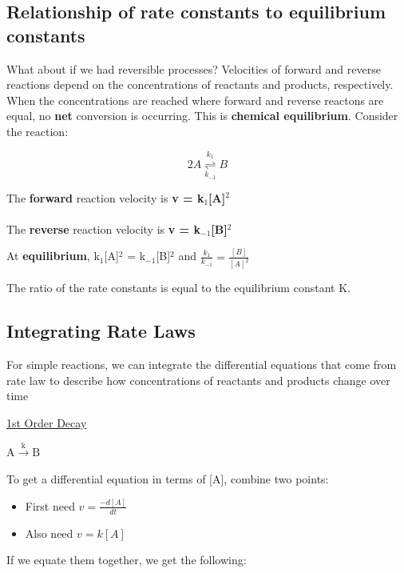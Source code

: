 \documentclass[12pt, letterpaper]{article}
\begin{document}
    \subsection*{Relationship of rate constants to equilibrium constants}

    What about if we had reversible processes? Velocities of forward and reverse reactions depend on the concentrations of 
    reactants and products, respectively. When the concentrations are reached where forward and reverse reactons are equal, 
    no \textbf{net} conversion is occurring. This is \textbf{chemical equilibrium}. Consider the reaction:

    \begin{equation}
        2 A \stackrel{k_1}{\underset{k_{-1}}{\rightleftharpoons}} B
    \end{equation}

    The \textbf{forward} reaction velocity is \textbf{v = k$_1$[A]$^2$} \\ \\
    The \textbf{reverse} reaction velocity is \textbf{v = k$_{-1}$[B]$^2$}


    At \textbf{equilibrium}, k$_1$[A]$^2$ = k$_{-1}$[B]$^2$ and \( \frac{k_1}{k_{-1}} = \frac{[B]}{[A]^2} \)

    The ratio of the rate constants is equal to the equilibrium constant K. 

    \subsection*{Integrating Rate Laws}

    For simple reactions, we can integrate the differential equations that come from rate law to describe how concentrations of reactants and products change over time

    \underline{1st Order Decay}
    
    \(\mathrm{A} \stackrel{\mathrm{k}}{\longrightarrow} \mathrm{B} \)

    To get a differential equation in terms of [A], combine two points: 
    \begin{itemize}
        \item First need \(v = \frac{-d[A]}{dt} \)
        \item Also need \(v = k[A] \)
    \end{itemize}

    \newpage

    If we equate them together, we get the following: 
\end{document}
